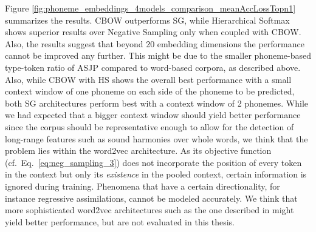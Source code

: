 \documentclass[6pt]{article}
\begin{document}
Figure \ref{fig:phoneme_embeddings_4models_comparison_meanAccLossTopn1} summarizes the results.  CBOW outperforms SG, while Hierarchical Softmax shows superior results over Negative Sampling only when coupled with CBOW. Also, the results suggest  that beyond 20 embedding dimensions the performance cannot be improved any further. This might be due to the smaller phoneme-based type-token ratio of ASJP compared to word-based corpora, as described above.  Also, while CBOW with HS shows the overall best performance with a small context window of one phoneme on each side of the phoneme to be predicted, both SG architectures perform best with a context window of 2 phonemes. While we had expected that a bigger context window should yield better performance since the corpus should be representative enough to allow for the detection of long-range features such as sound harmonies over whole words, we think that the problem lies within  the word2vec architecture. As its objective function (cf.~Eq.~\ref{eq:neg_sampling_3}) does not incorporate the position of every token in the context but only its \textit{existence} in the pooled context, certain information is ignored during training. Phenomena that have a certain directionality, for instance regressive  assimilations, cannot be modeled accurately. We think that more sophisticated word2vec architectures such as the one described in \cite{ling2015two} might yield better performance, but are not evaluated in this thesis.
\end{document}
